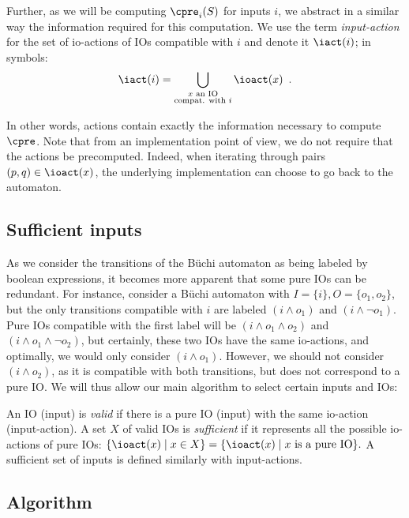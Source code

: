 \documentclass[runningheads,a4paper]{llncs}
\begin{document}
Further, as we will be computing \(\cpre_i(S)\) for inputs \(i\), we abstract in a
similar way the information required for this computation.  We use the term
\emph{input-action} for the set of io-actions of IOs compatible with \(i\) and denote
it \(\iact(i)\); in symbols:
\[\iact(i) = \bigcup_{\substack{x \text{ an IO}\\\text{compat. with }i}} \ioact(x) \enspace.\]

In other words, actions contain exactly the information necessary to compute
\(\cpre\).  Note that from an implementation point of view, we do not require that
the actions be precomputed.  Indeed, when iterating through pairs
\((p, q) \in \ioact(x)\), the underlying implementation can choose to go back to the
automaton.

\subsection{Sufficient inputs}\label{sec:sufficient}

As we consider the transitions of the Büchi automaton as being labeled by
boolean expressions, it becomes more apparent that some pure IOs can be
redundant.  For instance, consider a Büchi automaton with
\(I = \{i\}, O = \{o_1, o_2\}\), but the only transitions compatible with \(i\) are
labeled \((i \land o_1)\) and \((i \land \neg o_1)\).  Pure IOs compatible with the first
label will be \((i \land o_1 \land o_2)\) and \((i \land o_1 \land \neg o_2)\), but
certainly, these two IOs have the same io-actions, and optimally, we would only
consider \((i \land o_1)\).  However, we should not consider \((i \land o_2)\), as it is
compatible with both transitions, but does not correspond to a pure IO.  We will
thus allow our main algorithm to select certain inputs and IOs:
\begin{definition}
  An IO (\resp input) is \emph{valid} if there is a pure IO (\resp input) with
  the same io-action (\resp input-action).  A set \(X\) of valid IOs is
  \emph{sufficient} if it represents all the possible io-actions of pure IOs:
  \(\{\ioact(x) \mid x \in X\} = \{\ioact(x) \mid x \text{ is a pure IO}\}.\)
  A sufficient set of inputs is defined similarly with input-actions.
\end{definition}

\subsection{Algorithm}\label{sec:algo}
\end{document}
